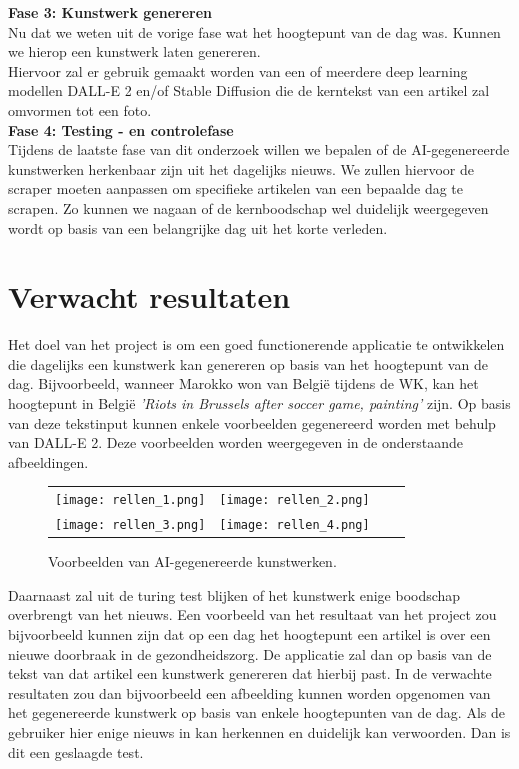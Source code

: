 \noindent
\textbf{Fase 3: Kunstwerk genereren} \\
Nu dat we weten uit de vorige fase wat het hoogtepunt van de dag was. Kunnen we hierop een kunstwerk laten genereren. \\
Hiervoor zal er gebruik gemaakt worden van een of meerdere deep learning modellen DALL-E 2 en/of Stable Diffusion die de kerntekst van een artikel zal omvormen tot een foto. \\

\noindent
\textbf{Fase 4: Testing - en controlefase} \\ 
Tijdens de laatste fase van dit onderzoek willen we bepalen of de AI-gegenereerde kunstwerken herkenbaar zijn uit het dagelijks nieuws. We zullen hiervoor de scraper moeten aanpassen om specifieke artikelen van een bepaalde dag te scrapen. Zo kunnen we nagaan of de kernboodschap wel duidelijk weergegeven wordt op basis van een belangrijke dag uit het korte verleden.
\section{Verwacht resultaten}%
\label{sec:verwachte_resultaten}
Het doel van het project is om een goed functionerende applicatie te ontwikkelen die dagelijks een kunstwerk kan genereren op basis van het hoogtepunt van de dag. Bijvoorbeeld, wanneer Marokko won van België tijdens de WK, kan het hoogtepunt in België \emph{'Riots in Brussels after soccer game, painting'} zijn. Op basis van deze tekstinput kunnen enkele voorbeelden gegenereerd worden met behulp van DALL-E 2. Deze voorbeelden worden weergegeven in de onderstaande afbeeldingen.


\begin{figure}[h!]
    \centering
    \begin{tabular}{llll}
        \texttt{[image: rellen\_1.png]} &
        \texttt{[image: rellen\_2.png]} \\
        \texttt{[image: rellen\_3.png]} &
        \texttt{[image: rellen\_4.png]}
    \end{tabular}
    \caption{Voorbeelden van AI-gegenereerde kunstwerken.}
    \label{fig:examples}
\end{figure}
\noindent
Daarnaast zal uit de turing test blijken of het kunstwerk enige boodschap overbrengt van het nieuws.
\noindent
Een voorbeeld van het resultaat van het project zou bijvoorbeeld kunnen zijn dat op een dag het hoogtepunt een artikel is over een nieuwe doorbraak in de gezondheidszorg. De applicatie zal dan op basis van de tekst van dat artikel een kunstwerk genereren dat hierbij past. In de verwachte resultaten zou dan bijvoorbeeld een afbeelding kunnen worden opgenomen van het gegenereerde kunstwerk op basis van enkele hoogtepunten van de dag. Als de gebruiker hier enige nieuws in kan herkennen en duidelijk kan verwoorden. Dan is dit een geslaagde test. 
\pagebreak

